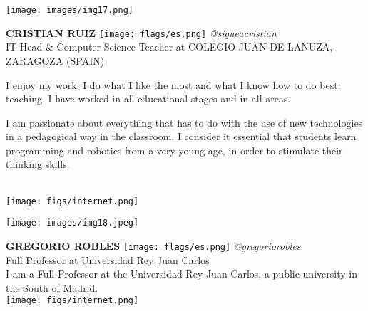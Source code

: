 \noindent
\begin{minipage}{0.3\textwidth}
\centering
\texttt{[image: images/img17.png]}
\end{minipage}
\hfill
\begin{minipage}{0.6\textwidth}\raggedright
\color{color1}\uppercase{\textbf{CRISTIAN RUIZ}}
\color{color2}\hspace{0.2cm}\texttt{[image: flags/es.png]}
\hspace{0.2cm}\textit{@sigueacristian}
\\
IT Head \& Computer Science Teacher at COLEGIO JUAN DE LANUZA, ZARAGOZA (SPAIN)\\
{\footnotesize I enjoy my work, I do what I like the most and what I know how to do best: teaching. I have worked in all educational stages and in all areas.

I am passionate about everything that has to do with the use of new technologies in a pedagogical way in the classroom. I consider it essential that students learn programming and robotics from a very young age, in order to stimulate their thinking skills.}\\
\texttt{[image: figs/internet.png]}
\end{minipage}
\newline\newline\newline

\noindent
\begin{minipage}{0.3\textwidth}
\centering
\texttt{[image: images/img18.jpeg]}
\end{minipage}
\hfill
\begin{minipage}{0.6\textwidth}\raggedright
\color{color1}\uppercase{\textbf{Gregorio Robles}}
\color{color2}\hspace{0.2cm}\texttt{[image: flags/es.png]}
\hspace{0.2cm}\textit{@gregoriorobles}
\\
Full Professor at Universidad Rey Juan Carlos\\
{\footnotesize I am a Full Professor at the Universidad Rey Juan Carlos, a public university in the South of Madrid.}\\
\texttt{[image: figs/internet.png]}
\end{minipage}
\newline\newline\newline

